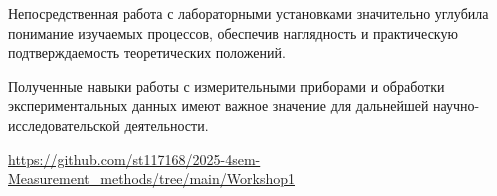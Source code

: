 Непосредственная работа с лабораторными установками значительно углубила понимание изучаемых процессов, обеспечив наглядность и практическую подтверждаемость теоретических положений. 

Полученные навыки работы с измерительными приборами и обработки экспериментальных данных имеют важное значение для дальнейшей научно-исследовательской деятельности.
\begin{thebibliography}{9}

\url{https://github.com/st117168/2025-4sem-Measurement_methods/tree/main/Workshop1} 

\end{thebibliography}


